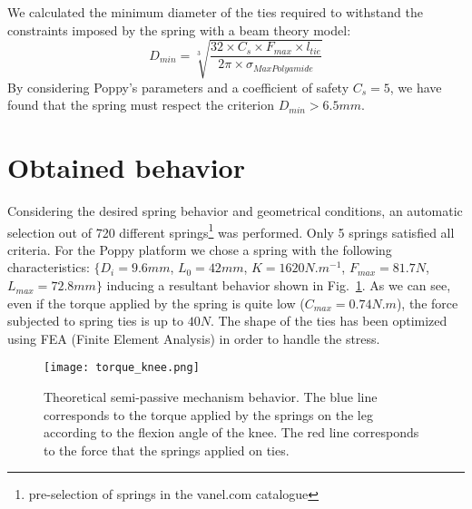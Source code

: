 We calculated the minimum diameter of the ties required to withstand the constraints imposed by the spring with a beam theory model:
\begin{equation}
    D_{min}= \sqrt[3]{ \frac{32 \times  C_s \times F_{max} \times l_{tie}}{2 \pi \times \sigma_{MaxPolyamide}} }
\end{equation}
By considering Poppy's parameters and a coefficient of safety $C_s = 5$, we have found that the spring must respect the criterion $D_{min} > 6.5 mm$.

\section{Obtained behavior} %
\label{sub:obtained_behavior}

Considering the desired spring behavior and geometrical conditions, an automatic selection out of 720 different springs\footnote{pre-selection of springs in the vanel.com catalogue} was performed. Only 5 springs satisfied all criteria. For the Poppy platform we chose a spring with the following characteristics: $\{ D_i=9.6mm$, $L_0=42mm$, $K=1620N.m^{-1}$, $F_{max}=81.7 N$, $L_{max}=72.8 mm \}$ inducing a resultant behavior shown in Fig.~\ref{fig:knee_feature}. As we can see, even if the torque applied by the spring is quite low ($C_{max} = 0.74 N.m$), the force subjected to spring ties is up to $40N$. The shape of the ties has been optimized using FEA (Finite Element Analysis) in order to handle the stress.

\begin{figure}[ht]
    \centering
    \texttt{[image: torque\_knee.png]}
    \caption{Theoretical semi-passive mechanism behavior. The blue line corresponds to the torque applied by the springs on the leg according to the flexion angle of the knee. The red line corresponds to the force that the springs applied on ties.}
    \label{fig:knee_feature}
\end{figure}

